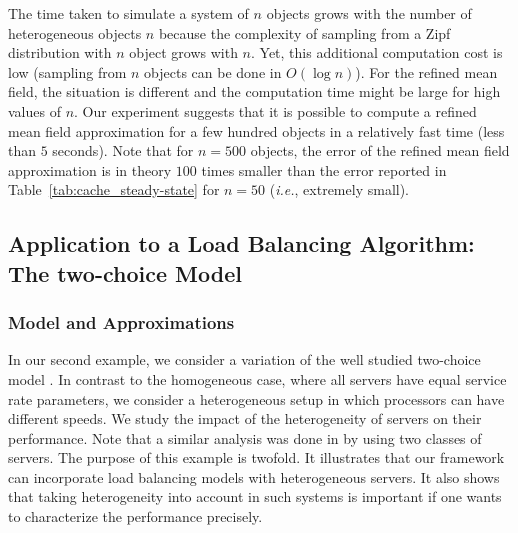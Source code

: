 \documentclass[acmsmall]{acmart}
\begin{document}
{The time taken to simulate a system of $n$ objects grows with the number of heterogeneous objects $n$ because the complexity of sampling from a Zipf distribution with $n$ object grows with $n$. Yet, this additional computation cost is low (sampling from $n$ objects can be done in $O(\log n)$).  For the refined mean field, the situation is different and the computation time might be large for high values of $n$. Our experiment suggests that it is possible to compute a refined mean field approximation for a few hundred objects in a relatively fast time (less than $5$ seconds). Note that for $n=500$ objects, the error of the refined mean field approximation is in theory $100$ times smaller than the error reported in Table~\ref{tab:cache_steady-state} for $n=50$ (\emph{i.e.}, extremely small). 
} 


\subsection{Application to a Load Balancing Algorithm: The two-choice Model}
\label{ssec:lbm}


\subsubsection{Model and Approximations}

In our second example, we consider a variation of the well studied two-choice model \cite{mitzenmacherPowerTwoChoices2001}. In contrast to the homogeneous case, where all servers have equal service rate parameters, we consider a heterogeneous setup in which processors can have different speeds. We study the impact of the heterogeneity of servers on their performance. Note that a similar analysis was done in \cite{mukhopadhyayAnalysisLoadBalancing2015} by using two classes of servers. The purpose of this example is twofold. It illustrates that our framework can incorporate load balancing models with heterogeneous servers. It also shows that taking heterogeneity into account in such systems is important if one wants to characterize the performance precisely.
\end{document}
